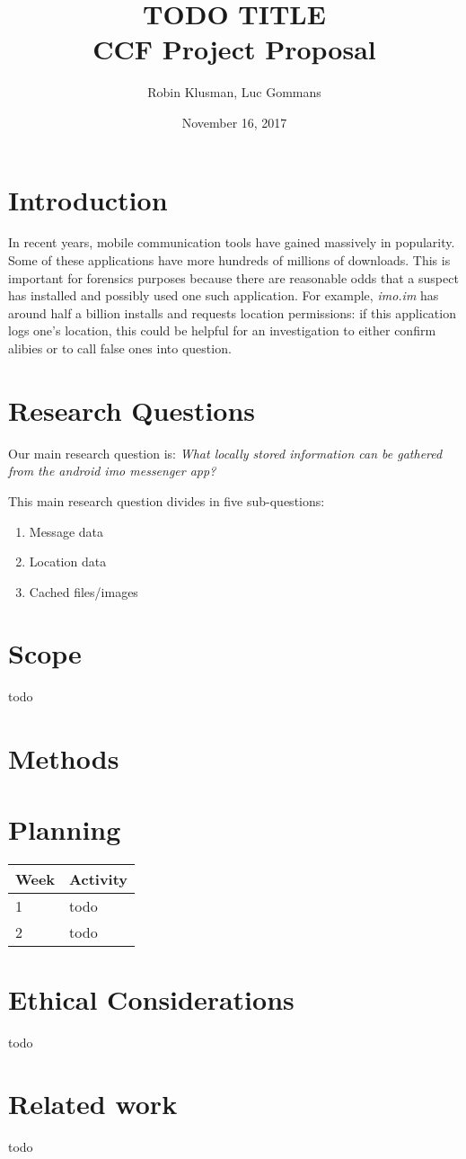 \documentclass{article}
\title{TODO TITLE \\
	\vspace{0.3cm}
	{\large CCF Project Proposal}
}
\date{November 16, 2017}
\author{Robin Klusman, Luc Gommans}
\begin{document}
\maketitle

\section{Introduction}

In recent years, mobile communication tools have gained massively in
popularity. Some of these applications have more hundreds of millions of
downloads. This is important for forensics purposes because there are
reasonable odds that a suspect has installed and possibly used one such
application. For example, {\it imo.im} has around half a billion installs and
requests location permissions: if this application logs one's location, this
could be helpful for an investigation to either confirm alibies or to call
false ones into question.


\section{Research Questions}

Our main research question is:
{\it What locally stored information can be gathered from the android imo messenger app?}

\vspace{0.5cm}

This main research question divides in five sub-questions:

\begin{enumerate}
	\item Message data
	\item Location data
	\item Cached files/images
\end{enumerate}


\section{Scope}

todo


\section{Methods}




\section{Planning}

\begin{tabular}[H]{ | l | p{10.2cm} | }
	\hline
	\textbf{Week} & \textbf{Activity} \\
	\hline 1 & todo \\
	\hline 2 & todo \\
	\hline
\end{tabular}


\section{Ethical Considerations}

todo


\section{Related work}

todo


\printbibliography
\end{document}
